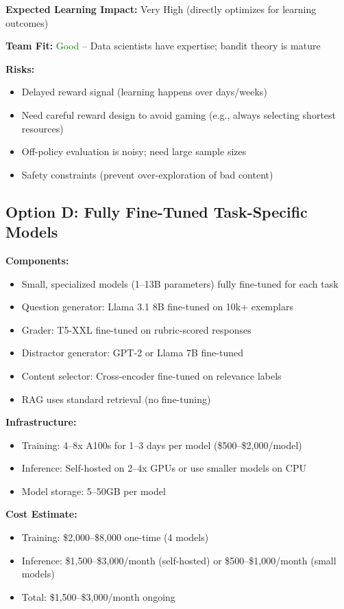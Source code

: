 \documentclass[11pt,letterpaper]{article}
\begin{document}
\textbf{Expected Learning Impact:} Very High (directly optimizes for learning outcomes)

\textbf{Team Fit:} \textcolor{green}{Good} -- Data scientists have expertise; bandit theory is mature

\textbf{Risks:}
\begin{itemize}
\item Delayed reward signal (learning happens over days/weeks)
\item Need careful reward design to avoid gaming (e.g., always selecting shortest resources)
\item Off-policy evaluation is noisy; need large sample sizes
\item Safety constraints (prevent over-exploration of bad content)
\end{itemize}

\subsection{Option D: Fully Fine-Tuned Task-Specific Models}\label{subsec:option-d}

\textbf{Components:}
\begin{itemize}
\item Small, specialized models (1--13B parameters) fully fine-tuned for each task
\item Question generator: Llama 3.1 8B fine-tuned on 10k+ exemplars
\item Grader: T5-XXL fine-tuned on rubric-scored responses
\item Distractor generator: GPT-2 or Llama 7B fine-tuned
\item Content selector: Cross-encoder fine-tuned on relevance labels
\item RAG uses standard retrieval (no fine-tuning)
\end{itemize}

\textbf{Infrastructure:}
\begin{itemize}
\item Training: 4--8x A100s for 1--3 days per model (\$500--\$2,000/model)
\item Inference: Self-hosted on 2--4x GPUs or use smaller models on CPU
\item Model storage: 5--50GB per model
\end{itemize}

\textbf{Cost Estimate:}
\begin{itemize}
\item Training: \$2,000--\$8,000 one-time (4 models)
\item Inference: \$1,500--\$3,000/month (self-hosted) or \$500--\$1,000/month (small models)
\item Total: \$1,500--\$3,000/month ongoing
\end{itemize}
\end{document}
